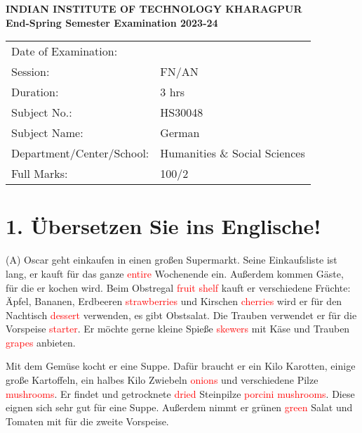 \documentclass[a4paper,12pt]{article}
\begin{document}
\begin{center}
    \textbf{INDIAN INSTITUTE OF TECHNOLOGY KHARAGPUR}\\
    \textbf{End-Spring Semester Examination 2023-24}\\
    \vspace{0.5cm}
    \begin{tabular}{l l}
        Date of Examination: & \hspace{2cm} \\
        Session: & FN/AN \\
        Duration: & 3 hrs \\
        Subject No.: & HS30048 \\
        Subject Name: & German \\
        Department/Center/School: & Humanities \& Social Sciences \\
        Full Marks: & 100/2 \\
    \end{tabular}
\end{center}

\vspace{1cm}

\section*{1. Übersetzen Sie ins Englische!}

(A) Oscar geht einkaufen in einen großen Supermarkt. Seine Einkaufsliste ist lang, er kauft für das ganze \textcolor{red}{entire} Wochenende ein. Außerdem kommen Gäste, für die er kochen wird. Beim Obstregal \textcolor{red}{fruit shelf} kauft er verschiedene Früchte: Äpfel, Bananen, Erdbeeren \textcolor{red}{strawberries} und Kirschen \textcolor{red}{cherries} wird er für den Nachtisch \textcolor{red}{dessert} verwenden, es gibt Obstsalat. Die Trauben verwendet er für die Vorspeise \textcolor{red}{starter}. Er möchte gerne kleine Spieße \textcolor{red}{skewers} mit Käse und Trauben \textcolor{red}{grapes} anbieten.

Mit dem Gemüse kocht er eine Suppe. Dafür braucht er ein Kilo Karotten, einige große Kartoffeln, ein halbes Kilo Zwiebeln \textcolor{red}{onions} und verschiedene Pilze \textcolor{red}{mushrooms}. Er findet   und getrocknete \textcolor{red}{dried} Steinpilze \textcolor{red}{porcini mushrooms}. Diese eignen sich sehr gut für eine Suppe. Außerdem nimmt er grünen \textcolor{red}{green} Salat und Tomaten mit für die zweite Vorspeise.
\end{document}
